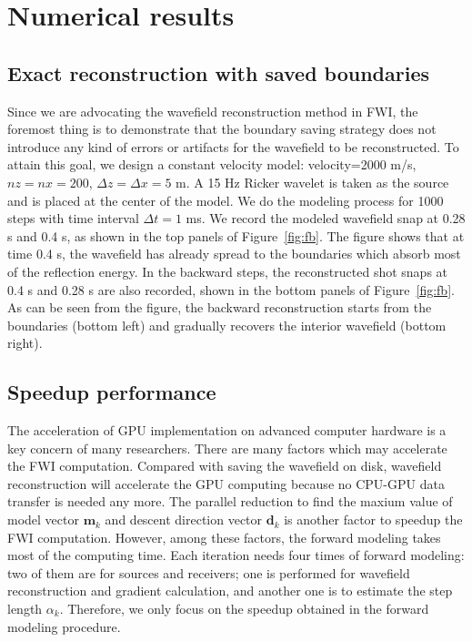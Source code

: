 
\section{Numerical results}

\subsection{Exact reconstruction with saved boundaries}


Since we are advocating the wavefield reconstruction method in FWI, the foremost thing is to demonstrate that the boundary saving strategy does not introduce any kind of errors or artifacts for the wavefield to be reconstructed. To attain this goal, we design a constant velocity model: velocity=2000 m/s, $nz=nx=200$, $\Delta z=\Delta x=5$ m. A 15 Hz Ricker wavelet is taken as the source and is placed at the center of the model. We do the modeling process for 1000 steps with time interval $\Delta t=1$ ms. We record the modeled wavefield snap at 0.28 s and 0.4 s, as shown in the top panels of Figure~\ref{fig:fb}. The figure shows that at time 0.4 s, the wavefield has already spread to the boundaries which absorb most of the reflection energy. In the backward steps, the reconstructed shot snaps at 0.4 s and 0.28 s are also recorded, shown in the bottom panels of Figure~\ref{fig:fb}. As can be seen from the figure, the backward reconstruction starts from the boundaries (bottom left) and gradually recovers the interior wavefield (bottom right). 



\subsection{Speedup performance}

The acceleration of GPU implementation on advanced computer hardware is a key concern of many researchers. There are many factors which may accelerate the FWI computation. Compared with saving the wavefield on disk, wavefield reconstruction will accelerate the GPU computing because no CPU-GPU data transfer is needed any more. The parallel reduction to find the maxium value of model vector $\textbf{m}_k$ and descent direction vector $\textbf{d}_k$ is another factor to speedup the FWI computation. However, among these factors, the forward modeling takes most of the computing time. Each iteration needs four times of forward modeling: two of them are for sources and receivers; one is performed for wavefield reconstruction and gradient calculation, and another one is to estimate the step length $\alpha_k$. Therefore, we only focus on the speedup obtained in the forward modeling procedure.

